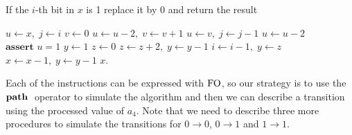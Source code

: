 \begin{algorithm}
	\caption{If the $i$-th bit in $x$ is 1 replace it by 0 and return the result}
	\label{switch1to0}
	\begin{algorithmic}
		\State $u \gets x,\; j \gets i$ 
		\State $v \gets 0$
		\State $u \gets u-2,\; v \gets v+1$
		\EndWhile
		\State $u\gets v,\; j \gets j-1$
		\EndWhile
		\State $u \gets u-2$
		\EndWhile
		\State $\textbf{assert } u = 1$ 	
		\State $y \gets 1$ 
		\State $z \gets 0$
		\State $z \gets z+2,\; y \gets y-1$
		\EndWhile
		\State $i \gets i-1,\; y \gets z$
		\EndWhile
		 
		\State $x \gets x-1,\; y \gets y-1$
		\EndWhile
		\State \Return $x$.
	\end{algorithmic}
\end{algorithm}	
Each of the instructions can be expressed with ${\rm FO}$, so our strategy is to use the ${\bf path} \;$ operator to simulate the algorithm and then we can describe a transition using the processed value of $a_4$. Note that we need to describe three more procedures to simulate the transitions for $0\to 0$, $0 \to 1$ and $1\to 1$.

